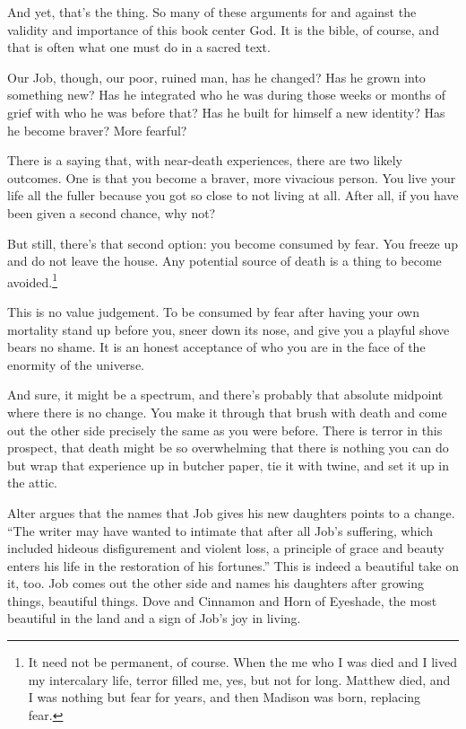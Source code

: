 And yet, that's the thing. So many of these arguments for and against the validity and importance of this book center God. It is the bible, of course, and that is often what one must do in a sacred text.

Our Job, though, our poor, ruined man, has he changed? Has he grown into something new? Has he integrated who he was during those weeks or months of grief with who he was before that? Has he built for himself a new identity? Has he become braver? More fearful?

There is a saying that, with near-death experiences, there are two likely outcomes. One is that you become a braver, more vivacious person. You live your life all the fuller because you got so close to not living at all. After all, if you have been given a second chance, why not?

But still, there's that second option: you become consumed by fear. You freeze up and do not leave the house. Any potential source of death is a thing to become avoided.\footnote{It need not be permanent, of course. When the me who I was died and I lived my intercalary life, terror filled me, yes, but not for long. Matthew died, and I was nothing but fear for years, and then Madison was born, replacing fear.}

This is no value judgement. To be consumed by fear after having your own mortality stand up before you, sneer down its nose, and give you a playful shove bears no shame. It is an honest acceptance of who you are in the face of the enormity of the universe.

And sure, it might be a spectrum, and there's probably that absolute midpoint where there is no change. You make it through that brush with death and come out the other side precisely the same as you were before. There is terror in this prospect, that death might be so overwhelming that there is nothing you can do but wrap that experience up in butcher paper, tie it with twine, and set it up in the attic.

Alter argues that the names that Job gives his new daughters points to a change. ``The writer may have wanted to intimate that after all Job's suffering, which included hideous disfigurement and violent loss, a principle of grace and beauty enters his life in the restoration of his fortunes.'' \parencite[579]{alter} This is indeed a beautiful take on it, too. Job comes out the other side and names his daughters after growing things, beautiful things. Dove and Cinnamon and Horn of Eyeshade, the most beautiful in the land and a sign of Job's joy in living.

